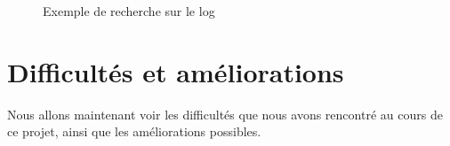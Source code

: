 \begin{figure}[!ht]
	\begin{center}
		\caption{Exemple de recherche sur le log}
  		\label{affichageExtraction}
  	\end{center}	
\end{figure}

\chapter{Difficultés et améliorations}

Nous allons maintenant voir les difficultés que nous avons rencontré au cours de ce projet, ainsi que les améliorations possibles. \\

